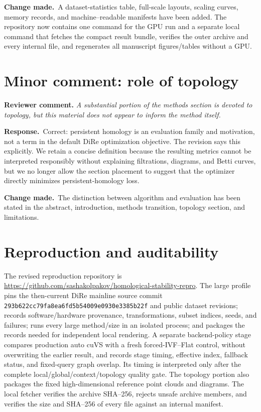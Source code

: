 \documentclass[11pt]{article}
\newcommand{\reviewcomment}[1]{%
  \medskip\noindent\textbf{Reviewer comment.} \emph{#1}\par\smallskip}
\newcommand{\response}{%
  \noindent\textcolor{responseblue}{\textbf{Response.}}\ }
\newcommand{\change}{%
  \noindent\textcolor{responseblue}{\textbf{Change made.}}\ }
\begin{document}
\change A dataset-statistics table, full-scale layouts, scaling curves, memory
records, and machine--readable manifests have been added. The repository now
contains one command for the GPU run and a separate local command that fetches
the compact result bundle, verifies the outer archive and every internal file,
and regenerates all manuscript figures/tables without a GPU.

\section*{Minor comment: role of topology}

\reviewcomment{A substantial portion of the methods section is devoted to
topology, but this material does not appear to inform the method itself.}

\response Correct: persistent homology is an evaluation family and motivation,
not a term in the default DiRe optimization objective. The revision says this
explicitly. We retain a concise definition because the resulting metrics cannot
be interpreted responsibly without explaining filtrations, diagrams, and Betti
curves, but we no longer allow the section placement to suggest that the
optimizer directly minimizes persistent-homology loss.

\change The distinction between algorithm and evaluation has been stated in the
abstract, introduction, methods transition, topology section, and limitations.

\section*{Reproduction and auditability}

The revised reproduction repository is
\url{https://github.com/sashakolpakov/homological-stability-repro}. The large
profile pins the then-current DiRe mainline source commit
\nolinkurl{293b622cc79fa8ea6fd5b54009e0930e3385b22f} and public dataset
revisions; records
software/hardware provenance, transformations, subset indices, seeds, and
failures; runs every large method/size in an isolated process; and packages
the records needed for independent local rendering. A separate backend-policy
stage compares production auto cuVS with a fresh forced-IVF--Flat control,
without overwriting the earlier result, and records stage timing, effective
index, fallback status, and fixed-query graph overlap. Its timing is interpreted
only after the complete local/global/context/topology quality gate. The topology portion also
packages the fixed high-dimensional reference point clouds and diagrams. The local
fetcher
verifies the archive SHA--256, rejects unsafe archive members, and verifies the
size and SHA--256 of every file against an internal manifest.
\end{document}
